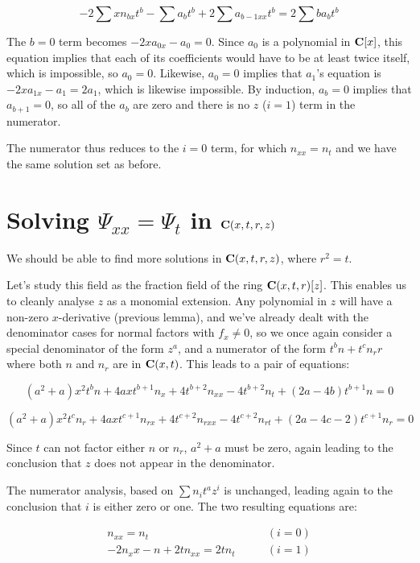 \documentclass{article}
\newcommand{\C}{\ensuremath{{\bf C}}}
\begin{document}
$$-2\sum x n_{bx} t^b - \sum a_b t^b + 2 \sum a_{b-1xx} t^{b} = 2 \sum b a_b t^b$$

The $b=0$ term becomes $-2xa_{0x} - a_0 = 0$.  Since $a_0$ is a polynomial
in $\C[x]$, this equation implies that each of its coefficients would have
to be at least twice itself, which is impossible, so $a_0=0$.  Likewise,
$a_0=0$ implies that $a_1$'s equation is $-2xa_{1x}-a_1=2a_1$, which is
likewise impossible.  By induction, $a_b=0$ implies that $a_{b+1}=0$,
so all of the $a_b$ are zero and there is no $z$ ($i=1$) term in
the numerator.

The numerator thus reduces to the $i=0$ term, for which $n_{xx}=n_t$
and we have the same solution set as before.

\vfill\eject
\section*{Solving $\Psi_{xx}=\Psi_t$ in $\C(x,t,r,z)$}

We should be able to find more solutions in $\C(x,t,r,z)$, where $r^2=t$.

Let's study this field as the fraction field of the ring
$\C(x,t,r)[z]$.  This enables us to cleanly analyse $z$ as a monomial
extension.  Any polynomial in $z$ will have a non-zero $x$-derivative
(previous lemma), and we've already dealt with the denominator cases for
normal factors with $f_x \ne 0$, so we once again consider a special
denominator of the form $z^a$, and a numerator of the form $t^b n +
t^c n_r r$ where both $n$ and $n_r$ are in $\C(x,t)$.  This leads
to a pair of equations:

$$(a^{2} +a)x^{2}t^{b}n +4axt^{b +1}n_{x} +4t^{b +2}n_{xx} -4t^{b +2}n_{t} +(2a -4b)t^{b +1}n = 0$$

$$(a^{2} +a)x^{2}t^{c}n_r +4axt^{c +1}n_{rx} +4t^{c +2}n_{rxx} -4t^{c +2}n_{rt} +(2a -4c -2)t^{c +1}n_r = 0$$

Since $t$ can not factor either $n$ or $n_r$, $a^2+a$ must be zero, again
leading to the conclusion that $z$ does not appear in the denominator.

The numerator analysis, based on $\sum n_i t^a z^i$ is unchanged, leading
again to the conclusion that $i$ is either zero or one.  The two resulting
equations are:

\begin{align*}
n_{xx} = n_t   & \qquad (i=0) \\
-2n_x x - n + 2 t n_{xx} = 2 t n_t  &  \qquad (i=1)
\end{align*}
\end{document}
